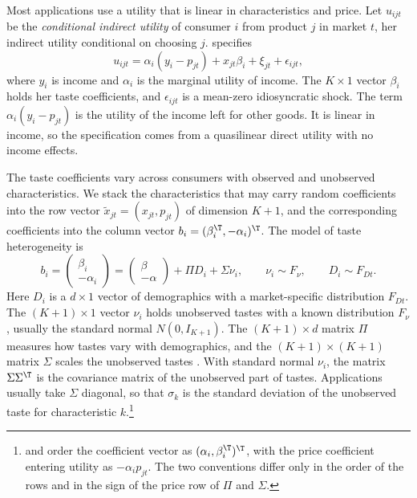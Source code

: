 Most applications use a utility that is linear in characteristics and price. Let $u_{ijt}$ be the
\emph{conditional indirect utility} of consumer $i$ from product $j$ in market $t$, her indirect utility
conditional on choosing $j$. \citet[eq.~(1)]{Nevo2000a} specifies
\begin{equation}\label{eq:08-nevo-utility}
  u_{ijt} = \alpha_i (y_i - p_{jt}) + x_{jt}\beta_i + \xi_{jt} + \epsilon_{ijt},
\end{equation}
where $y_i$ is income and $\alpha_i$ is the marginal utility of income. The $K \times 1$ vector
$\beta_i$ holds her taste coefficients, and $\epsilon_{ijt}$ is a mean-zero idiosyncratic shock. The term
$\alpha_i(y_i - p_{jt})$ is the utility of the income left for other goods. It is linear in income, so the
specification comes from a quasilinear direct utility with no income effects.

The taste coefficients vary across consumers with observed and unobserved characteristics. We stack the
characteristics that may carry random coefficients into the row vector
$\tilde x_{jt} = (x_{jt}, p_{jt})$ of dimension $K + 1$, and the corresponding coefficients into the column
vector $b_i = (\beta_i^\T, -\alpha_i)^\T$. The model of taste heterogeneity is
\begin{equation}\label{eq:08-tastes}
  b_i = \begin{pmatrix} \beta_i \\ -\alpha_i \end{pmatrix}
      = \begin{pmatrix} \beta \\ -\alpha \end{pmatrix} + \Pi D_i + \Sigma \nu_i,
  \qquad \nu_i \sim F_\nu, \qquad D_i \sim F_{Dt}.
\end{equation}
Here $D_i$ is a $d \times 1$ vector of demographics with a market-specific distribution $F_{Dt}$. The
$(K+1) \times 1$ vector $\nu_i$ holds unobserved tastes with a known distribution $F_\nu$, usually the standard
normal $N(0, I_{K+1})$. The $(K+1) \times d$ matrix $\Pi$ measures how tastes vary with demographics, and the
$(K+1) \times (K+1)$ matrix $\Sigma$ scales the unobserved tastes \citep[eq.~(2)]{Nevo2000a}. With standard normal
$\nu_i$, the matrix $\Sigma\Sigma^\T$ is the covariance matrix of the unobserved part of tastes.
Applications usually take $\Sigma$ diagonal, so that $\sigma_k$ is the standard deviation of the
unobserved taste for characteristic $k$.\footnote{\citet[eq.~(2)]{Nevo2000a} and \citet[eq.~(3)]{Nevo2001}
order the coefficient vector as $(\alpha_i, \beta_i^\T)^\T$, with the price coefficient entering utility
as $-\alpha_i p_{jt}$. The two conventions differ only in the order of the rows and in the sign of the price
row of $\Pi$ and $\Sigma$.}

